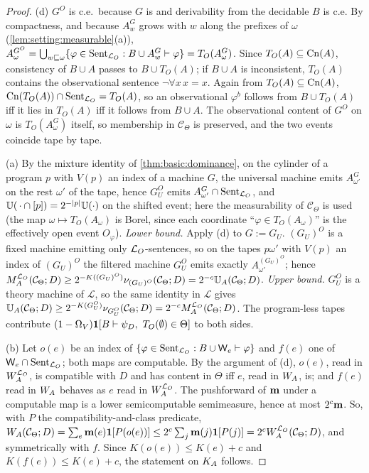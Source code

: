 \begin{proof}
(d) $G^O$ is c.e.\ because $G$ is and derivability from the decidable $B$ is c.e. By compactness, and because $A^G_w$ grows with $w$ along the prefixes of $\omega$ (\cref{lem:setting:measurable}(a)), $A^{G^O}_\omega=\bigcup_{w\sqsubseteq\omega}\{\varphi\in\mathrm{Sent}_{\mathcal{L}_{O}}:B\cup A^G_w\vdash\varphi\}=T_O(A^G_\omega)$. Since $T_O(A)\subseteq\mathrm{Cn}(A)$, consistency of $B\cup A$ passes to $B\cup T_O(A)$; if $B\cup A$ is inconsistent, $T_O(A)$ contains the observational sentence $\neg\forall x\,x=x$. Again from $T_O(A)\subseteq\mathrm{Cn}(A)$, $\mathrm{Cn}(T_O(A))\cap\mathrm{Sent}_{\mathcal{L}_{O}}=T_O(A)$, so an observational $\varphi^b$ follows from $B\cup T_O(A)$ iff it lies in $T_O(A)$ iff it follows from $B\cup A$. The observational content of $G^O$ on $\omega$ is $T_O(A^G_\omega)$ itself, so membership in $\mathcal C_\Theta$ is preserved, and the two events coincide tape by tape.

(a) By the mixture identity of \cref{thm:basic:dominance}, on the cylinder of a program $p$ with $V(p)$ an index of a machine $G$, the universal machine emits $A^G_{\omega'}$ on the rest $\omega'$ of the tape, hence $G_U^O$ emits $A^G_{\omega'}\cap\mathrm{Sent}_{\mathcal{L}_{O}}$, and $\mathbb{U}(\,\cdot\cap[p])=2^{-\lvert p\rvert}\mathbb{U}(\cdot)$ on the shifted event; here the measurability of $\mathcal C_\Theta$ is used (the map $\omega\mapsto T_O(A_\omega)$ is Borel, since each coordinate ``$\varphi\in T_O(A_\omega)$'' is the effectively open event $O_\varphi$). \emph{Lower bound.} Apply (d) to $G:=G_U$. $(G_U)^O$ is a fixed machine emitting only $\mathcal{L}_{O}$-sentences, so on the tapes $p\omega'$ with $V(p)$ an index of $(G_U)^O$ the filtered machine $G_U^O$ emits exactly $A^{(G_U)^O}_{\omega'}$; hence $M_{A}^{\mathcal{L}_{O}}(\mathcal C_\Theta;D)\ge2^{-K((G_U)^O)}\nu_{(G_U)^O}(\mathcal C_\Theta;D)=2^{-c}\mathbb{U}_{A}(\mathcal C_\Theta;D)$. \emph{Upper bound.} $G_U^O$ is a theory machine of $\mathcal L$, so the same identity in $\mathcal L$ gives $\mathbb{U}_{A}(\mathcal C_\Theta;D)\ge2^{-K(G_U^O)}\nu_{G_U^O}(\mathcal C_\Theta;D)=2^{-c}M_{A}^{\mathcal{L}_{O}}(\mathcal C_\Theta;D)$. The program-less tapes contribute $(1-\Omega_V)\ind[B\vdash\psi_D,\ T_O(\emptyset)\in\Theta]$ to both sides.

(b) Let $o(e)$ be an index of $\{\varphi\in\mathrm{Sent}_{\mathcal{L}_{O}}:B\cup\mathsf{W}_{e}\vdash\varphi\}$ and $f(e)$ one of $\mathsf{W}_{e}\cap\mathrm{Sent}_{\mathcal{L}_{O}}$; both maps are computable. By the argument of (d), $o(e)$, read in $W_{A}^{\mathcal{L}_{O}}$, is compatible with $D$ and has content in $\Theta$ iff $e$, read in $W_{A}$, is; and $f(e)$ read in $W_{A}$ behaves as $e$ read in $W_{A}^{\mathcal{L}_{O}}$. The pushforward of $\mathbf{m}$ under a computable map is a lower semicomputable semimeasure, hence at most $2^c\mathbf{m}$. So, with $P$ the compatibility-and-class predicate, $W_{A}(\mathcal C_\Theta;D)=\sum_e\mathbf{m}(e)\mathbf{1}[P(o(e))]\le2^c\sum_j\mathbf{m}(j)\mathbf{1}[P(j)]=2^cW_{A}^{\mathcal{L}_{O}}(\mathcal C_\Theta;D)$, and symmetrically with $f$. Since $K(o(e))\le K(e)+c$ and $K(f(e))\le K(e)+c$, the statement on $K_{A}$ follows.


\end{proof}
